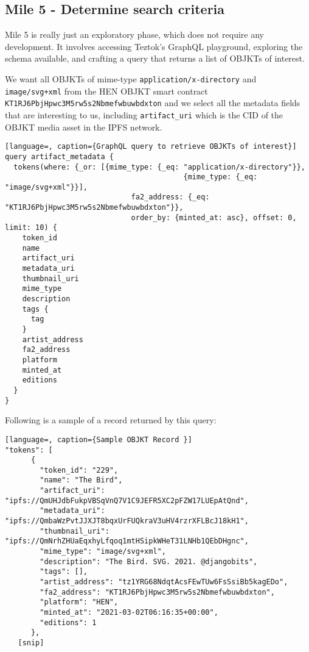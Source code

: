 \subsection {Mile 5 - Determine search criteria}

Mile 5 is really just an exploratory phase, which does not require any development. It involves accessing Teztok's GraphQL playground\footnotemark[7], exploring the schema available, and crafting a query that returns a list of OBJKTs of interest.


We want all OBJKTs of mime-type \texttt{application/x-directory} and \\ \texttt{image/svg+xml} from the HEN OBJKT smart contract \\\texttt{KT1RJ6PbjHpwc3M5rw5s2Nbmefwbuwbdxton} and we select all the metadata fields that are interesting to us, including \texttt{artifact\_uri} which is the CID of the OBJKT media asset in the IPFS network.


\vspace{0.5cm}

\begin{lstlisting}[language=, caption={GraphQL query to retrieve OBJKTs of interest}] 
query artifact_metadata {
  tokens(where: {_or: [{mime_type: {_eq: "application/x-directory"}},
    									 {mime_type: {_eq: "image/svg+xml"}}],
    						 fa2_address: {_eq: "KT1RJ6PbjHpwc3M5rw5s2Nbmefwbuwbdxton"}},
    						 order_by: {minted_at: asc}, offset: 0, limit: 10) {
    token_id
    name
    artifact_uri
    metadata_uri
    thumbnail_uri
    mime_type
    description
    tags {
      tag
    }
    artist_address
    fa2_address
    platform
    minted_at
    editions
  }
}
\end{lstlisting}


Following is a sample of a record returned by this query:


\vspace{0.5cm}

\begin{lstlisting}[language=, caption={Sample OBJKT Record }] 
"tokens": [
      {
        "token_id": "229",
        "name": "The Bird",
        "artifact_uri": "ipfs://QmUHJdbFukpVBSqVnQ7V1C9JEFR5XC2pFZW17LUEpAtQnd",
        "metadata_uri": "ipfs://QmbaWzPvtJJXJT8bqxUrFUQkraV3uHV4rzrXFLBcJ18kH1",
        "thumbnail_uri": "ipfs://QmNrhZHUaEqxhyLfqoq1mtHSipkWHeT31LNHb1QEbDHgnc",
        "mime_type": "image/svg+xml",
        "description": "The Bird. SVG. 2021. @djangobits",
        "tags": [],
        "artist_address": "tz1YRG68NdqtAcsFEwTUw6FsSsiBb5kagEDo",
        "fa2_address": "KT1RJ6PbjHpwc3M5rw5s2Nbmefwbuwbdxton",
        "platform": "HEN",
        "minted_at": "2021-03-02T06:16:35+00:00",
        "editions": 1
      },
   [snip]
\end{lstlisting}





